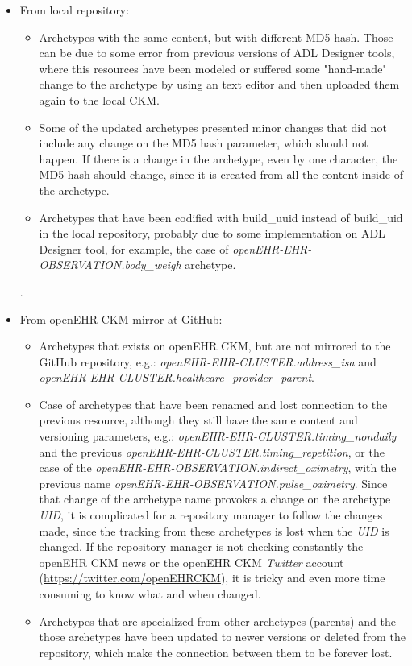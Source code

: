 \documentclass[mim_thesis.tex]{subfiles}
\begin{document}
\begin{itemize}[noitemsep]
\item From local repository:
\begin{itemize}
\item Archetypes with the same content, but with different MD5 hash. Those can be due to some error from previous versions of ADL Designer tools, where this resources have been modeled or suffered some "hand-made" change to the archetype by using an text editor and then uploaded them again to the local CKM. 
\item Some of the updated archetypes presented minor changes that did not include any change on the MD5 hash parameter, which should not happen. If there is a change in the archetype, even by one character, the MD5 hash should change, since it is created from all the content inside of the archetype.
\item Archetypes that have been codified with build\_uuid instead of build\_uid in the local repository, probably due to some implementation on ADL Designer tool, for example, the case of \textit{openEHR-EHR-OBSERVATION.body\_weigh} archetype.
\end{itemize}
.
\item From openEHR CKM mirror at GitHub:
\begin{itemize}
\item Archetypes that exists on openEHR CKM, but are not mirrored to the GitHub repository, e.g.: \textit{openEHR-EHR-CLUSTER.address\_isa} and \textit{openEHR-EHR-CLUSTER.healthcare\_provider\_parent}.
\item Case of archetypes that have been renamed and lost connection to the previous resource, although they still have the same content and versioning parameters, e.g.: \textit{openEHR-EHR-CLUSTER.timing\_nondaily} and the previous \textit{openEHR-EHR-CLUSTER.timing\_repetition}, or the case of the \textit{openEHR-EHR-OBSERVATION.indirect\_oximetry}, with the previous name \textit{openEHR-EHR-OBSERVATION.pulse\_oximetry}. Since that change of the archetype name provokes a change on the archetype \textit{UID}, it is complicated for a repository manager to follow the changes made, since the tracking from these archetypes is lost when the \textit{UID} is changed. If the repository manager is not checking constantly the openEHR CKM news or the openEHR CKM \textit{Twitter} account (\url{https://twitter.com/openEHRCKM}), it is tricky and even more time consuming to know what and when changed.
\item Archetypes that are specialized from other archetypes (parents) and the those archetypes have been updated to newer versions or deleted from the repository, which make the connection between them to be forever lost.
\end{itemize}
\end{itemize}
\end{document}
